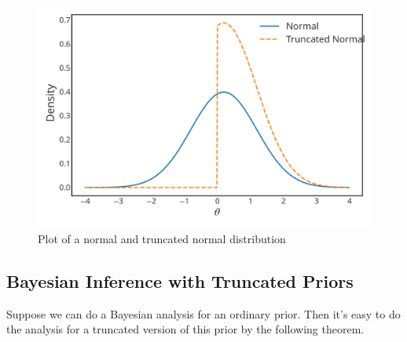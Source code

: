 \begin{figure}[ht]

\includegraphics{images/truncatednormal.svg}
\caption{Plot of a normal and truncated normal distribution}
\label{fig:normaltrunc}

\end{figure}


\subsection*{Bayesian Inference with Truncated Priors}

Suppose we can do a Bayesian analysis for an ordinary prior.
Then it's easy to do the analysis for a truncated version of this prior by the following theorem.

